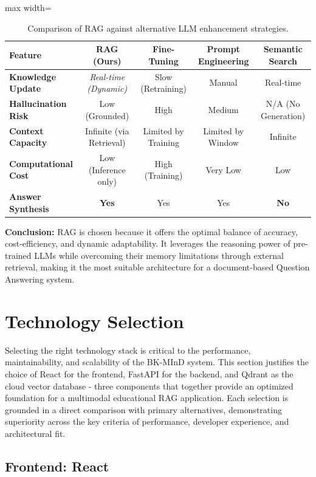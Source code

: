 \begin{table}[H]
\centering
\caption{Comparison of RAG against alternative LLM enhancement strategies.}
\label{tab:rag_comparison}
\begin{adjustbox}{max width=\linewidth}
\begin{tabular}{lcccc}
\toprule
\textbf{Feature} & \textbf{RAG (Ours)} & \textbf{Fine-Tuning} & \textbf{Prompt Engineering} & \textbf{Semantic Search} \\ \midrule
\textbf{Knowledge Update} & \textit{Real-time (Dynamic)} & Slow (Retraining) & Manual & Real-time \\
\textbf{Hallucination Risk} & Low (Grounded) & High & Medium & N/A (No Generation) \\
\textbf{Context Capacity} & Infinite (via Retrieval) & Limited by Training & Limited by Window & Infinite \\
\textbf{Computational Cost} & Low (Inference only) & High (Training) & Very Low & Low \\
\textbf{Answer Synthesis} & \textbf{Yes} & Yes & Yes & \textbf{No} \\ \bottomrule
\end{tabular}
\end{adjustbox}
\end{table}

\textbf{Conclusion:}
RAG is chosen because it offers the optimal balance of accuracy, cost-efficiency, and dynamic adaptability. It leverages the reasoning power of pre-trained LLMs while overcoming their memory limitations through external retrieval, making it the most suitable architecture for a document-based Question Answering system.

\section{Technology Selection}

Selecting the right technology stack is critical to the performance, maintainability, and scalability of the BK-MInD system. This section justifies the choice of React for the frontend, FastAPI for the backend, and Qdrant as the cloud vector database - three components that together provide an optimized foundation for a multimodal educational RAG application. Each selection is grounded in a direct comparison with primary alternatives, demonstrating superiority across the key criteria of performance, developer experience, and architectural fit.

\subsection{Frontend: React}

